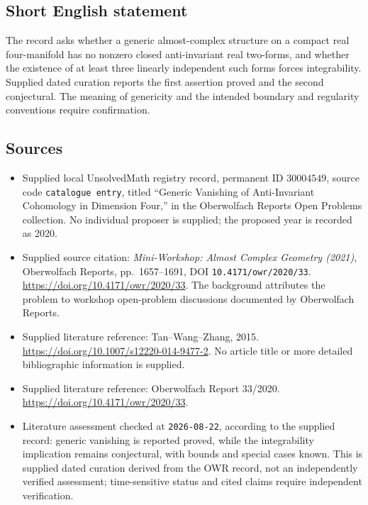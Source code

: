 \documentclass[11pt]{article}
\begin{document}
\subsection{Short English statement}
The record asks whether a generic almost-complex structure on a compact real four-manifold has no nonzero closed anti-invariant real two-forms, and whether the existence of at least three linearly independent such forms forces integrability. Supplied dated curation reports the first assertion proved and the second conjectural. The meaning of genericity and the intended boundary and regularity conventions require confirmation.
\subsection{Sources}
\begin{itemize}
\item Supplied local UnsolvedMath registry record, permanent ID \(30004549\), source code \texttt{catalogue entry}, titled ``Generic Vanishing of Anti-Invariant Cohomology in Dimension Four,'' in the Oberwolfach Reports Open Problems collection. No individual proposer is supplied; the proposed year is recorded as 2020.
\item Supplied source citation: \emph{Mini-Workshop: Almost Complex Geometry (2021)}, Oberwolfach Reports, pp.\ 1657--1691, DOI \texttt{10.4171/owr/2020/33}. \url{https://doi.org/10.4171/owr/2020/33}. The background attributes the problem to workshop open-problem discussions documented by Oberwolfach Reports.
\item Supplied literature reference: Tan--Wang--Zhang, 2015. \url{https://doi.org/10.1007/s12220-014-9477-2}. No article title or more detailed bibliographic information is supplied.
\item Supplied literature reference: Oberwolfach Report 33/2020. \url{https://doi.org/10.4171/owr/2020/33}.
\item Literature assessment checked at \texttt{2026-08-22}, according to the supplied record: generic vanishing is reported proved, while the integrability implication remains conjectural, with bounds and special cases known. This is supplied dated curation derived from the OWR record, not an independently verified assessment; time-sensitive status and cited claims require independent verification.
\end{itemize}
\end{document}
